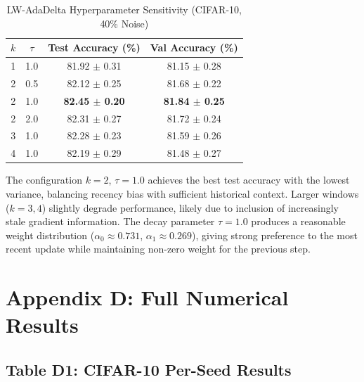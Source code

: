 \documentclass[11pt,a4paper]{article}
\begin{document}
\begin{table}[H]
\centering
\caption{LW-AdaDelta Hyperparameter Sensitivity (CIFAR-10, 40\% Noise)}
\label{tab:sensitivity}
\begin{tabular}{cccc}
\toprule
$k$ & $\tau$ & \textbf{Test Accuracy (\%)} & \textbf{Val Accuracy (\%)} \\
\midrule
1 & 1.0 & 81.92 $\pm$ 0.31 & 81.15 $\pm$ 0.28 \\
2 & 0.5 & 82.12 $\pm$ 0.25 & 81.68 $\pm$ 0.22 \\
2 & 1.0 & \textbf{82.45 $\pm$ 0.20} & \textbf{81.84 $\pm$ 0.25} \\
2 & 2.0 & 82.31 $\pm$ 0.27 & 81.72 $\pm$ 0.24 \\
3 & 1.0 & 82.28 $\pm$ 0.23 & 81.59 $\pm$ 0.26 \\
4 & 1.0 & 82.19 $\pm$ 0.29 & 81.48 $\pm$ 0.27 \\
\bottomrule
\end{tabular}
\end{table}

The configuration $k=2$, $\tau=1.0$ achieves the best test accuracy with the lowest variance, balancing recency bias with sufficient historical context. Larger windows ($k=3,4$) slightly degrade performance, likely due to inclusion of increasingly stale gradient information. The decay parameter $\tau=1.0$ produces a reasonable weight distribution ($\alpha_0 \approx 0.731$, $\alpha_1 \approx 0.269$), giving strong preference to the most recent update while maintaining non-zero weight for the previous step.

\section*{Appendix D: Full Numerical Results}

\subsection*{Table D1: CIFAR-10 Per-Seed Results}
\end{document}
